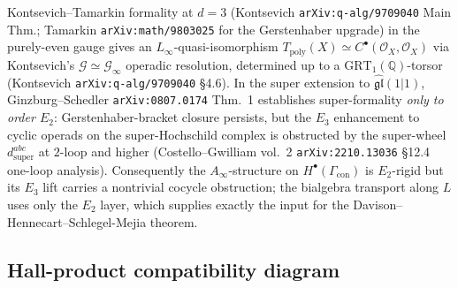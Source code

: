 \documentclass[11pt]{amsart}
\theoremstyle{definition}
\providecommand{\cO}{\mathcal{O}}
\providecommand{\cG}{\mathcal{G}}
\providecommand{\bQ}{\mathbb{Q}}
\providecommand{\fgl}{\mathfrak{gl}}
\begin{document}
Kontsevich--Tamarkin formality at $d = 3$ (Kontsevich
\texttt{arXiv:q-alg/9709040} Main Thm.; Tamarkin
\texttt{arXiv:math/9803025} for the Gerstenhaber upgrade) in the
purely-even gauge gives an $L_\infty$-quasi-isomorphism
$T_{\mathrm{poly}}(X) \simeq C^\bullet(\cO_X, \cO_X)$ via Kontsevich's
$\cG \simeq \cG_\infty$ operadic resolution, determined up to a
$\mathrm{GRT}_1(\bQ)$-torsor (Kontsevich \texttt{arXiv:q-alg/9709040}
\S4.6). In the super extension to $\widehat{\fgl}(1|1)$,
Ginzburg--Schedler \texttt{arXiv:0807.0174} Thm.~1 establishes
super-formality \emph{only to order $E_2$}: Gerstenhaber-bracket closure
persists, but the $E_3$ enhancement to cyclic operads on the
super-Hochschild complex is obstructed by the super-wheel
$d^{abc}_{\mathrm{super}}$ at $2$-loop and higher (Costello--Gwilliam
vol.~2 \texttt{arXiv:2210.13036} \S12.4 one-loop analysis).
Consequently the $A_\infty$-structure on $H^\bullet(\Gamma_{\mathrm{con}})$
is $E_2$-rigid but its $E_3$ lift carries a nontrivial cocycle
obstruction; the bialgebra transport along $L$ uses only the $E_2$
layer, which supplies exactly the input for the
Davison--Hennecart--Schlegel-Mejia theorem.

\subsection{Hall-product compatibility diagram}
\label{subsec:vdb-hall-compat}
\end{document}

